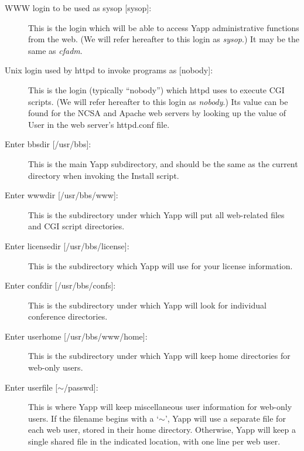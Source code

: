 \documentclass[twoside]{report}
\begin{document}
\begin{enumerate}
\begin{description}
      \item[{WWW login to be used as sysop [sysop]:}] 
         \mbox{}\newline
         This is the login which 
         will be able to access Yapp administrative functions from the web.
         (We will refer hereafter to this login as {\em sysop}.)
         It may be the same as {\em cfadm}.

      \item[{Unix login used by httpd to invoke programs as [nobody]:}] 
         \mbox{}\newline
         This is the login (typically ``nobody'') which httpd 
         uses to execute CGI scripts.  (We will refer hereafter to this login 
         as {\em nobody}.) Its value can be found for the NCSA and Apache web 
         servers by looking up the value of User in the web server's 
         httpd.conf file.

      \item[{Enter bbsdir [/usr/bbs]:}] 
         \mbox{}\newline
         This is the main Yapp subdirectory, and should be the same as the 
         current directory when invoking the Install script.

      \item[{Enter wwwdir [/usr/bbs/www]:}] 
         \mbox{}\newline
         This is the subdirectory under which Yapp will put all web-related 
         files and CGI script directories.

      \item[{Enter licensedir [/usr/bbs/license]:}] 
         \mbox{}\newline
         This is the subdirectory which Yapp will use for your license 
         information.

      \item[{Enter confdir [/usr/bbs/confs]:}] 
         \mbox{}\newline
         This is the subdirectory under which Yapp will look for individual 
         conference directories.

      \item[{Enter userhome [/usr/bbs/www/home]:}] 
         \mbox{}\newline
         This is the subdirectory under which Yapp will keep home directories 
         for web-only users.

      \item[{Enter userfile [$\sim$/passwd]:}] 
         \mbox{}\newline
         This is where Yapp will keep miscellaneous user information for 
         web-only users.  If the filename begins with a `$\sim$', Yapp will 
         use a separate file for each web user, stored in their home 
         directory.  Otherwise, Yapp will keep a single shared file in the 
         indicated location, with one line per web user.


\end{description}
\end{enumerate}
\end{document}
